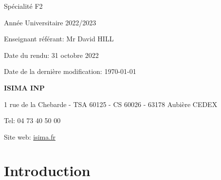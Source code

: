 \documentclass[12pt,french]{article} %
\begin{document}
\begin{titlepage}
\begin{center}
    Spécialité F2
    
    Année Universitaire 2022/2023
  \end{center}
  
  \begin{center}
  \end{center}
  
  \vspace*{2cm} 
  
  \begin{flushright}\footnotesize %
    Enseignant référant: Mr David HILL
    
    Date du rendu: 31 octobre 2022
    
    Date de la dernière modification: \today 
    
  \end{flushright}
  
  \begin{flushleft}\small %
    \textbf{ISIMA INP}
    \footnotesize
    
    1 rue de la Chebarde - TSA 60125 - CS 60026 - 63178 Aubière CEDEX
    
    Tel: 04 73 40 50 00
    
    Site web: \href{https://www.isima.fr/}{isima.fr}\newline	
  \end{flushleft}
\end{titlepage}	


\renewcommand{\contentsname}{Table des Matières}
\normalsize\tableofcontents %

\bigskip

\section*{Introduction}
\end{document}
